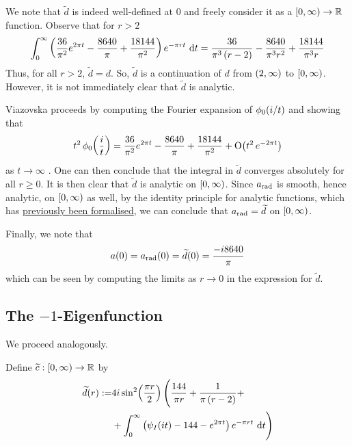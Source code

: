 We note that $\tilde{d}$ is indeed well-defined at $0$ and freely consider it as a $\left[0, \infty\right) \to \mathbb{R}$ function. Observe that for $r > 2$
\begin{align*}
    \int_{0}^{\infty} \left( \frac{36}{\pi^2}e^{2\pi t} - \frac{8640}{\pi} + \frac{18144}{\pi^2} \right) e^{-\pi r t} \, \operatorname{d}\!{t}
    = \frac{36}{\pi^3\left( r - 2 \right)} - \frac{8640}{\pi^3 r^2} + \frac{18144}{\pi^3 r}
\end{align*}
Thus, for all $r > 2$, $\tilde{d} = d$. So, $\tilde{d}$ is a continuation of $d$  from $\left( 2, \infty \right)$ to $\left[0, \infty\right)$. However, it is not immediately clear that $\tilde{d}$ is analytic.

Viazovska proceeds by computing the Fourier expansion of $\phi_0\!\left( i/t \right)$ and showing that
\begin{align*}
    t^2 \, \phi_0\!\left( \frac{i}{t} \right) =
    \frac{36}{\pi^2}e^{2\pi t} - \frac{8640}{\pi} + \frac{18144}{\pi^2} + \operatorname{O}\!\left( t^2 \, e^{-2 \pi t} \right)
\end{align*}
as $t \to \infty$ \cite[(39)]{Viazovska8}. One can then conclude that the integral in $\tilde{d}$ converges absolutely for all $r \geq 0$. It is then clear that $\tilde{d}$ is analytic on $\left[0, \infty\right)$. Since $a_{\operatorname{rad}}$ is smooth, hence analytic, on $\left[0, \infty\right)$ as well, by the identity principle for analytic functions, which has \href{https://github.com/leanprover-community/mathlib4/blob/6c6e0180f0d3dc9f47f85532f48d268d8656789a/Mathlib/Analysis/Analytic/Uniqueness.lean#L217-L226}{previously been formalised}, we can conclude that $a_{\operatorname{rad}} = \widetilde{d}$ on $\left[0, \infty\right)$.

Finally, we note that
\begin{align*}
    a\!\left( 0 \right) = a_{\operatorname{rad}}\!\left( 0 \right) = \widetilde{d}\!\left( 0 \right) = \frac{-i 8640}{\pi}
\end{align*}
which can be seen by computing the limits as $r \to 0$ in the expression for $\tilde{d}$.

\subsection{The $-1$-Eigenfunction}

We proceed analogously.

\begin{boxdefinition}
    Define $\widetilde{c} : \left[0, \infty\right) \to \mathbb{R}$ by
    \begin{align*}
        \widetilde{d}(r) :=&
        4i \sin^2\!\left( \frac{\pi r}{2} \right) \Bigg(
        \frac{144}{\pi r} + \frac{1}{\pi\left( r - 2 \right)} + \\
        &+\int_{0}^{\infty} \left( \psi_I\!\left( it \right) - 144 - e^{2 \pi t} \right) e^{-\pi r t} \, \operatorname{d}\!{t}\Bigg)
    \end{align*}
\end{boxdefinition}

